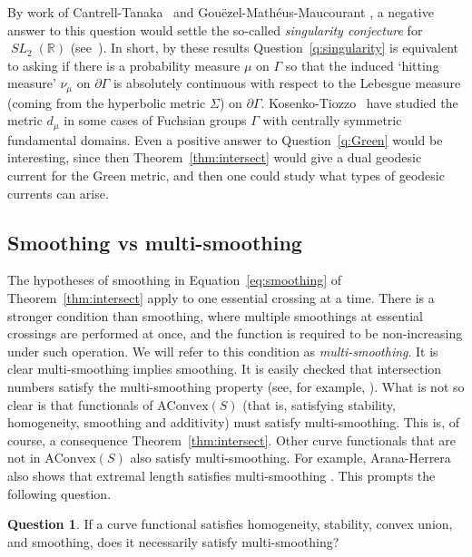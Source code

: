 \documentclass[11pt]{amsart}
\numberwithin{equation}{section}
\numberwithin{figure}{section}
\theoremstyle{definition}
\newtheorem{question}[theorem]{Question}
\theoremstyle{plain}
\DeclareMathOperator{\SL}{\mathit{SL}}
\newcommand{\AConvex}{\mathrm{AConvex}}
\begin{document}
By work of Cantrell-Tanaka~\cite[Theorem~1.2]{CT25} and
Gouëzel-Mathéus-Maucourant \cite[Theorem~1.2]{GMM18:Entropy}, a
negative answer to this question would settle the so-called
\emph{singularity conjecture} for $\SL_2(\mathbb{R})$
(see~\cite[Conjecture, page~~259]{KLP11:Singularity}). In short, by
these results Question~\ref{q:singularity} is equivalent to asking if
there is a probability measure $\mu$ on $\Gamma$ so that the induced
`hitting measure' $\nu_{\mu}$ on $\partial \Gamma$ is absolutely
continuous with respect to the Lebesgue measure (coming from the
hyperbolic metric $\Sigma$) on $\partial \Gamma$.
Kosenko-Tiozzo~\cite{KT22:Inequality} have studied the metric $d_{\mu}$ in some cases of Fuchsian groups $\Gamma$ with centrally symmetric fundamental domains.
Even a positive answer to Question~\ref{q:Green} would be interesting, since then
Theorem~\ref{thm:intersect} would give a dual geodesic current for the
Green metric, and then one could study what types of geodesic currents
can arise.

\subsection{Smoothing vs multi-smoothing}
\label{subsec:multismoothing}
The hypotheses of smoothing in Equation~\eqref{eq:smoothing} of Theorem~\ref{thm:intersect} apply to one essential crossing at a time. There is a stronger condition than smoothing, where multiple smoothings at essential crossings are performed at once, and the function is required to be non-increasing under such operation.
We will refer to this condition as \emph{multi-smoothing}.
It is clear multi-smoothing implies smoothing.
It is easily checked that intersection numbers satisfy the multi-smoothing property (see, for example, \cite{AH21:EffectiveCounting3}).
What is not so clear is that functionals of $\AConvex(S)$ (that is, satisfying stability, homogeneity, smoothing and additivity) must satisfy multi-smoothing. This is, of course, a consequence Theorem~\ref{thm:intersect}.
Other curve functionals that are not in $\AConvex(S)$ also satisfy
multi-smoothing. For example, Arana-Herrera also shows
that extremal length satisfies
multi-smoothing \cite{AH21:EffectiveCounting3}.
This prompts the following question.

\begin{question}\label{quest:multi-smoothing}
If a curve functional satisfies homogeneity, stability, convex union,
and smoothing, does it necessarily satisfy multi-smoothing?
\end{question}
\end{document}

